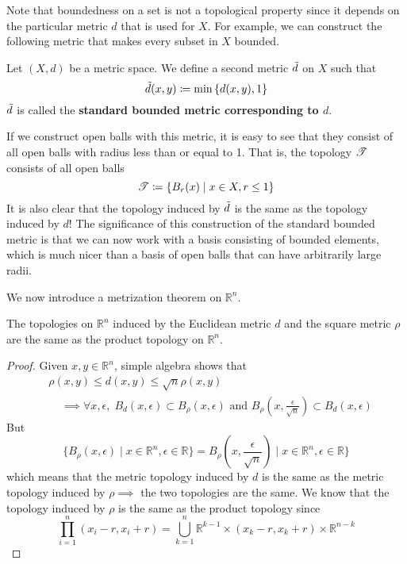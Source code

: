   Note that boundedness on a set is not a topological property since it depends on the particular metric $d$ that is used for $X$. For example, we can construct the following metric that makes every subset in $X$ bounded. 

  \begin{definition}
    Let $(X, d)$ be a metric space. We define a second metric $\Tilde{d}$ on $X$ such that
    \begin{equation}
      \Tilde{d} (x, y) \coloneqq \min{\{d(x, y), 1\}}
    \end{equation}
    $\Tilde{d}$ is called the \textbf{standard bounded metric corresponding to $d$}. 
  \end{definition}

  If we construct open balls with this metric, it is easy to see that they consist of all open balls with radius less than or equal to 1. That is, the topology $\operatorname{\mathscr{T}}$ consists of all open balls
  \begin{equation}
    \operatorname{\mathscr{T}} \coloneqq \{B_r (x) \mid x \in X, r \leq 1\}
  \end{equation}
  It is also clear that the topology induced by $\Tilde{d}$ is the same as the topology induced by $d$! The significance of this construction of the standard bounded metric is that we can now work with a basis consisting of bounded elements, which is much nicer than a basis of open balls that can have arbitrarily large radii.  

  We now introduce a metrization theorem on $\mathbb{R}^n$. 

  \begin{theorem}
    The topologies on $\mathbb{R}^n$ induced by the Euclidean metric $d$ and the square metric $\rho$ are the same as the product topology on $\mathbb{R}^n$. 
  \end{theorem}
  \begin{proof}
    Given $x, y \in \mathbb{R}^n$, simple algebra shows that 
    \begin{align*}
      & \rho(x, y) \leq d(x, y) \leq \sqrt{n} \rho(x, y) \\
      & \;\;\;\; \implies \forall x, \epsilon, \; B_d (x, \epsilon) \subset B_\rho (x, \epsilon) \text{ and } B_\rho (x, \frac{\epsilon}{\sqrt{n}}) \subset B_d (x, \epsilon)
    \end{align*}
    But
    \begin{equation}
      \{ B_\rho (x, \epsilon) \mid x \in \mathbb{R}^n, \epsilon \in \mathbb{R}\} = B_\rho (x, \frac{\epsilon}{\sqrt{n}}) \mid x \in \mathbb{R}^n, \epsilon \in \mathbb{R}\}
    \end{equation}
    which means that the metric topology induced by $d$ is the same as the metric topology induced by $\rho \implies$ the two topologies are the same. We know that the topology induced by $\rho$ is the same as the product topology since 
    \begin{equation}
      \prod_{i=1}^n (x_i - r, x_i + r) = \bigcup_{k=1}^n \mathbb{R}^{k-1} \times (x_k - r, x_k + r) \times \mathbb{R}^{n-k}
    \end{equation}
  \end{proof}

